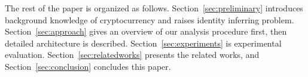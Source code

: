 The rest of the paper is organized as follows. Section~\ref{sec:preliminary} introduces background knowledge of cryptocurrency and raises identity inferring problem. Section~\ref{sec:approach} gives an overview of our analysis procedure first, then detailed architecture is described. Section~\ref{sec:experiments} is experimental evaluation. Section~\ref{sec:relatedworks} presents the related works, and Section~\ref{sec:conclusion} concludes this paper.



